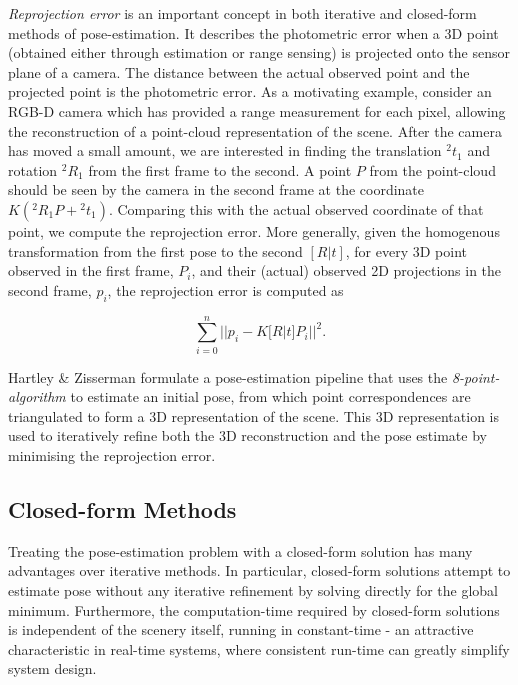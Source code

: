 \textit{Reprojection error} is an important concept in both iterative and closed-form methods of pose-estimation. It describes the photometric error when a 3D point (obtained either through estimation or range sensing) is projected onto the sensor plane of a camera. The distance between the actual observed point and the projected point is the photometric error. As a motivating example, consider an RGB-D camera which has provided a range measurement for each pixel, allowing the reconstruction of a point-cloud representation of the scene. After the camera has moved a small amount, we are interested in finding the translation $^2t_1$ and rotation $^2R_1$ from the first frame to the second. A point $P$ from the point-cloud should be seen by the camera in the second frame at the coordinate $K({^2R_1P} + {^2t_1})$. Comparing this with the actual observed coordinate of that point, we compute the reprojection error. More generally, given the homogenous transformation from the first pose to the second $[R|t]$, for every 3D point observed in the first frame, $P_i$, and their (actual) observed 2D projections in the second frame, $p_i$, the reprojection error is computed as 


$$ \sum_{i=0}^{n}{|| p_i - K [R | t] {P_i} ||^2}.$$

Hartley \& Zisserman \cite{zisserman2004multiview} formulate a pose-estimation pipeline that uses the \textit{8-point-algorithm} to estimate an initial pose, from which point correspondences are triangulated to form a 3D representation of the scene. This 3D representation is used to iteratively refine both the 3D reconstruction and the pose estimate by minimising the reprojection error.


\subsection{Closed-form Methods}

Treating the pose-estimation problem with a closed-form solution has many advantages over iterative methods. In particular, closed-form solutions attempt to estimate pose without any iterative refinement by solving directly for the global minimum. Furthermore, the computation-time required by closed-form solutions is independent of the scenery itself, running in constant-time - an attractive characteristic in real-time systems, where consistent run-time can greatly simplify system design. 

